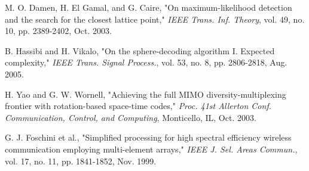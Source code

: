 \documentclass[twocolumn,conference]{IEEEtran}
\begin{document}
\begin{thebibliography}{14}
 M. O. Damen, H. El Gamal, and G. Caire, "On maximum-likelihood detection and the search for the closest lattice point," \textit{IEEE Trans. Inf. Theory}, vol. 49, no. 10, pp. 2389-2402, Oct. 2003.

 B. Hassibi and H. Vikalo, "On the sphere-decoding algorithm I. Expected complexity," \textit{IEEE Trans. Signal Process.}, vol. 53, no. 8, pp. 2806-2818, Aug. 2005.

 H. Yao and G. W. Wornell, "Achieving the full MIMO diversity-multiplexing frontier with rotation-based space-time codes," \textit{Proc. 41st Allerton Conf. Communication, Control, and Computing}, Monticello, IL, Oct. 2003.

 G. J. Foschini et al., "Simplified processing for high spectral efficiency wireless communication employing multi-element arrays," \textit{IEEE J. Sel. Areas Commun.}, vol. 17, no. 11, pp. 1841-1852, Nov. 1999.
\end{thebibliography}
\end{document}
